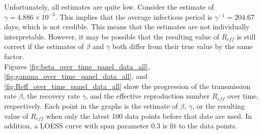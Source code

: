 \documentclass[12pt]{article}
\begin{document}
\begin{appendices}
    	Unfortunately, all estimates are quite low. Consider the estimate of $\gamma = 4.886 \times 10^{-3}$. This implies that the average infectious period is $\gamma^{-1} = 204.67$ days, which is not credible. This means that the estimates are not individually interpretable. However, it may be possible that the resulting value of $R_{eff}$ is still correct if the estimates of $\beta$ and $\gamma$ both differ from their true value by the same factor. \\
		
		Figures \ref{fig:beta_over_time_panel_data_all}, \ref{fig:gamma_over_time_panel_data_all}, and \ref{fig:Reff_over_time_panel_data_all} show the progression of the transmission rate $\beta$, the recovery rate $\gamma$, and the effective reproduction number $R_{eff}$ over time, respectively. Each point in the graphs is the estimate of $\beta$, $\gamma$, or the resulting value of $R_{eff}$ when only the latest 100 data points before that date are used. In addition, a LOESS curve with span parameter 0.3 is fit to the data points.
		

\end{appendices}
\end{document}
